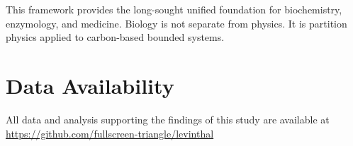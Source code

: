﻿\documentclass[twocolumn,10pt,a4paper]{article}
\theoremstyle{definition}
\theoremstyle{remark}
\begin{document}
This framework provides the long-sought unified foundation for biochemistry, enzymology, and medicine. Biology is not separate from physics. It is partition physics applied to carbon-based bounded systems.

\section*{Data Availability}

All data and analysis supporting the findings of this study are available at \url{https://github.com/fullscreen-triangle/levinthal}




\end{document}
